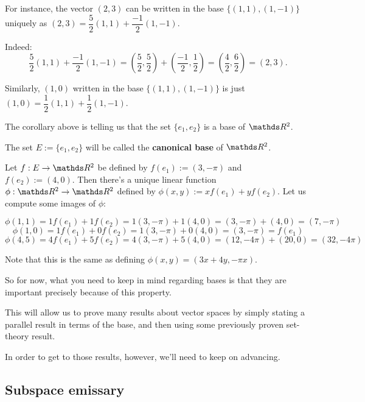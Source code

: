 \begin{ex}
	For instance, the vector $(2,3)$ can be written in the base $\{(1,1),(1,-1)\}$ uniquely as $(2,3)=\dfrac{5}{2}(1,1)+\dfrac{-1}{2}(1,-1)$.
	
	Indeed:
	\[\dfrac{5}{2}(1,1)+\dfrac{-1}{2}(1,-1)=\left(\dfrac{5}{2},\dfrac{5}{2}\right)+\left(\dfrac{-1}{2},\dfrac{1}{2}\right)=\left(\dfrac{4}{2},\dfrac{6}{2}\right)=(2,3).\]
	
	Similarly, $(1,0)$ written in the base $\{(1,1),(1,-1)\}$ is just $(1,0)=\dfrac{1}{2}(1,1)+\dfrac{1}{2}(1,-1)$.
\end{ex}

The corollary above is telling us that the set $\{e_1,e_2\}$ is a base of $\R^2$.

\begin{df}
	The set $E:=\{e_1,e_2\}$ will be called the \textbf{canonical base} of $\R^2$.
\end{df}

\begin{ex}
	Let $f:E\to\R^2$ be defined by $f(e_1):=(3,-\pi)$ and $f(e_2):=(4,0)$. Then there's a unique linear function $\phi:\R^2\to\R^2$ defined by $\phi(x,y):=xf(e_1)+yf(e_2)$. Let us compute some images of $\phi$:
	
	$$\phi(1,1)=1f(e_1)+1f(e_2)=1(3,-\pi)+1(4,0)=(3,-\pi)+(4,0)=(7,-\pi)$$
	$$\phi(1,0)=1f(e_1)+0f(e_2)=1(3,-\pi)+0(4,0)=(3,-\pi)=f(e_1)$$
	$$\phi(4,5)=4f(e_1)+5f(e_2)=4(3,-\pi)+5(4,0)=(12,-4\pi)+(20,0)=(32,-4\pi)$$
	
	Note that this is the same as defining $\phi(x,y)=(3x+4y,-\pi x)$.
\end{ex}

So for now, what you need to keep in mind regarding bases is that they are important precisely because of this property.

This will allow us to prove many results about vector spaces by simply stating a parallel result in terms of the base, and then using some previously proven set-theory result.

In order to get to those results, however, we'll need to keep on advancing.

\newpage
\subsection{Subspace emissary}


